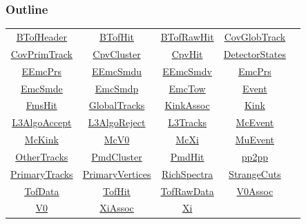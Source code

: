 \documentclass[10pt]{beamer}
\begin{document}
\begin{frame}
  \frametitle{Outline}
  \begin{table}
    \centering
    \begin{tabular}{c c c c c}
      \hyperlink{BTofHeader}{BTofHeader} & \hyperlink{BTofHit}{BTofHit}
      & \hyperlink{BTofRawHit}{BTofRawHit} & \hyperlink{CovGlobTrack}{CovGlobTrack} \\
      \hyperlink{CovPrimTrack}{CovPrimTrack} & \hyperlink{CpvCluster}{CpvCluster}
      & \hyperlink{CpvHit}{CpvHit} & \hyperlink{DetectorStates}{DetectorStates} \\
      \hyperlink{EEmcPrs}{EEmcPrs} & \hyperlink{EEmcSmdu}{EEmcSmdu}
      & \hyperlink{EEmcSmdv}{EEmcSmdv} & \hyperlink{EmcPrs}{EmcPrs} \\
      \hyperlink{EmcSmde}{EmcSmde} & \hyperlink{EmcSmdp}{EmcSmdp}
      & \hyperlink{EmcTow}{EmcTow} & \hyperlink{Event}{Event} \\
      \hyperlink{FmsHit}{FmsHit} & \hyperlink{GlobalTracks}{GlobalTracks}
      & \hyperlink{KinkAssoc}{KinkAssoc} & \hyperlink{Kink}{Kink} \\
      \hyperlink{L3AlgoAccept}{L3AlgoAccept} & \hyperlink{L3AlgoReject}{L3AlgoReject}
      & \hyperlink{L3Tracks}{L3Tracks} & \hyperlink{McEvent}{McEvent} \\
      \hyperlink{McKink}{McKink} & \hyperlink{McV0}{McV0}
      & \hyperlink{McXi}{McXi} & \hyperlink{MuEvent}{MuEvent} \\
      \hyperlink{OtherTracks}{OtherTracks} & \hyperlink{PmdCluster}{PmdCluster}
      & \hyperlink{PmdHit}{PmdHit} & \hyperlink{pp2pp}{pp2pp} \\
      \hyperlink{PrimaryTracks}{PrimaryTracks} & \hyperlink{PrimaryVertices}{PrimaryVertices}
      & \hyperlink{RichSpectra}{RichSpectra} & \hyperlink{StrangeCuts}{StrangeCuts} \\
      \hyperlink{TofData}{TofData} & \hyperlink{TofHit}{TofHit}
      & \hyperlink{TofRawData}{TofRawData} & \hyperlink{V0Assoc}{V0Assoc} \\
      \hyperlink{V0}{V0} & \hyperlink{XiAssoc}{XiAssoc}
      & \hyperlink{Xi}{Xi}
                                                                          
    \end{tabular}
  \end{table}
\end{frame}
\end{document}
